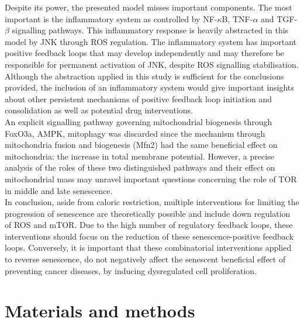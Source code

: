 Despite its power, the presented model misses important components. The most important is the inflammatory system as controlled by NF-$\kappa$B, TNF-$\alpha$ and TGF-$\beta$ signalling pathways. This inflammatory response is heavily abstracted in this model by JNK through ROS regulation. The inflammatory system has important positive feedback loops that may develop independently and may therefore be responsible for permanent activation of JNK, despite ROS signalling stabilisation. Although the abstraction applied in this study is sufficient for the conclusions provided, the inclusion of an inflammatory system would give important insights about other persistent mechanisms of positive feedback loop initiation and consolidation as well as potential drug interventions. \\
An explicit signalling pathway governing mitochondrial biogenesis through FoxO3a, AMPK, mitophagy was discarded since the mechanism through mitochondria fusion and biogenesis (Mfn2) had the same beneficial effect on mitochondria: the increase in total membrane potential. However, a precise analysis of the roles of these two distinguished pathways and their effect on mitochondrial mass may unravel important questions concerning the role of TOR in middle and late senescence.\\
In conclusion, aside from caloric restriction, multiple interventions for limiting the progression of senescence are theoretically possible and include down regulation of ROS and mTOR. Due to the high number of regulatory feedback loops, these interventions should focus on the reduction of these senescence-positive feedback loops. Conversely, it is important that these combinatorial interventions applied to reverse senescence, do not negatively affect the senescent beneficial effect of preventing cancer diseases, by inducing dysregulated cell proliferation. 


\section{Materials and methods}
\label{project3-sec:Materials and methods}
